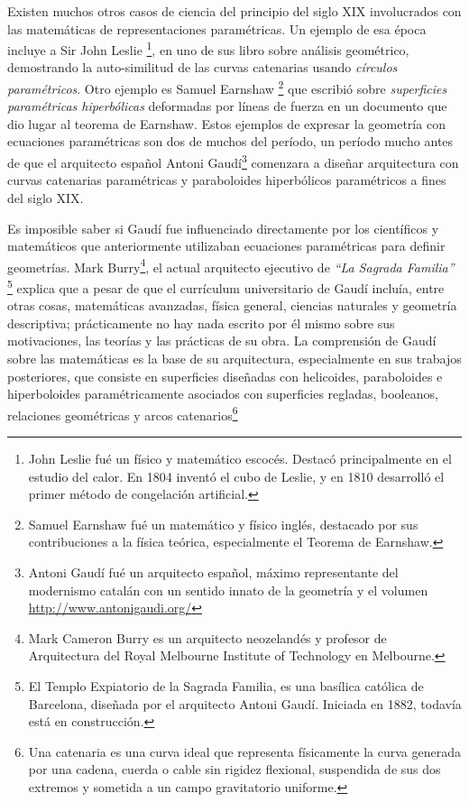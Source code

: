 Existen muchos otros casos de ciencia del principio del siglo XIX involucrados con las matemáticas de representaciones paramétricas. Un ejemplo de esa época incluye a Sir John Leslie \footnote{John Leslie fué un físico y matemático escocés. Destacó principalmente en el estudio del calor. En 1804 inventó el cubo de Leslie, y en 1810 desarrolló el primer método de congelación artificial.}, en uno de sus libro sobre análisis geométrico, demostrando la auto-similitud de las curvas catenarias usando \textit{círculos paramétricos}. Otro ejemplo es Samuel Earnshaw \footnote{Samuel Earnshaw fué un matemático y físico inglés, destacado por sus contribuciones a la física teórica, especialmente el Teorema de Earnshaw.} que escribió sobre \textit{superficies paramétricas hiperbólicas} deformadas por líneas de fuerza en un documento que dio lugar al teorema de Earnshaw. Estos ejemplos de expresar la geometría con ecuaciones paramétricas son dos de muchos del período, un período mucho antes de que el arquitecto español Antoni Gaudí\footnote{Antoni Gaudí fué un arquitecto español, máximo representante del modernismo catalán con un sentido innato de la geometría y el volumen \url{http://www.antonigaudi.org/} } comenzara a diseñar arquitectura con curvas catenarias paramétricas y paraboloides hiperbólicos paramétricos a fines del siglo XIX.

Es imposible saber si Gaudí fue influenciado directamente por los científicos y matemáticos que anteriormente utilizaban ecuaciones paramétricas para definir geometrías. 
Mark Burry\footnote{Mark Cameron Burry es un arquitecto neozelandés y profesor de Arquitectura del Royal Melbourne Institute of Technology en Melbourne.}, el actual arquitecto ejecutivo de \textit{``La Sagrada Familia''} \footnote{El Templo Expiatorio de la Sagrada Familia, es una basílica católica de Barcelona, diseñada por el arquitecto Antoni Gaudí. Iniciada en 1882, todavía está en construcción.} explica que a pesar de que el currículum universitario de Gaudí incluía, entre otras cosas, matemáticas avanzadas, física general, ciencias naturales y geometría descriptiva; prácticamente no hay nada escrito por él mismo sobre sus motivaciones, las teorías y las prácticas de su obra. La comprensión de Gaudí sobre las matemáticas es la base de su arquitectura, especialmente en sus trabajos posteriores, que consiste en superficies diseñadas con helicoides, paraboloides e hiperboloides paramétricamente asociados con superficies regladas, booleanos, relaciones geométricas y arcos catenarios\footnote{Una catenaria es una curva ideal que representa físicamente la curva generada por una cadena, cuerda o cable sin rigidez flexional, suspendida de sus dos extremos y sometida a un campo gravitatorio uniforme.}

